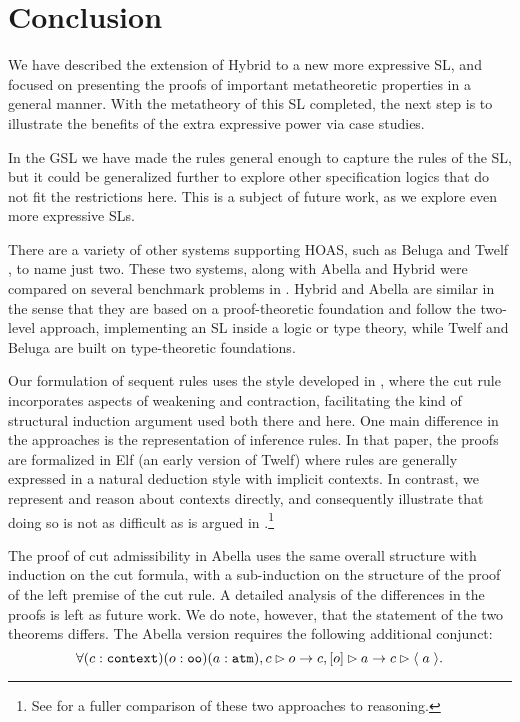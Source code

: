 \section{Conclusion}
\label{sec:concl}

We have described the extension of Hybrid to a new more expressive SL,
and focused on presenting the proofs of important metatheoretic
properties in a general manner.
With the metatheory of this SL completed, the next step is to
illustrate the benefits of the extra expressive power via case
studies.

In the GSL we have made the rules general enough to capture the rules
of the SL, but it could be generalized further to explore other
specification logics that do not fit the restrictions here.  This is a
subject of future work, as we explore even more expressive SLs.

There are a variety of other systems supporting HOAS, such as Beluga
\cite{Pientka:IJCAR10} and Twelf \cite{TwelfSP}, to name just two.
These two systems, along with Abella and Hybrid were compared on
several benchmark problems in \cite{FMP:JAR15}.  Hybrid and Abella are
similar in the sense that they are based on a proof-theoretic
foundation and follow the two-level approach, implementing an SL
inside a logic or type theory, while Twelf and Beluga are built on
type-theoretic foundations.

Our formulation of sequent rules uses the style developed in
\cite{Pfenning:IC00}, where the cut rule incorporates aspects of
weakening and contraction, facilitating the kind of structural
induction argument used both there and here.  One main difference in
the approaches is the representation of inference rules.  In that
paper, the proofs are formalized in Elf (an early version of Twelf)
where rules are generally expressed in a natural deduction style with
implicit contexts.  In contrast, we represent and reason about
contexts directly, and consequently illustrate that doing so is not as
difficult as is argued in \cite{Pfenning:IC00}.\footnote{See
  \cite{FMP:JAR15} for a fuller comparison of these two approaches to
  reasoning.}

The proof of cut admissibility in Abella uses the same overall
structure with induction on the cut formula, with a sub-induction on
the structure of the proof of the left premise of the cut rule.  A
detailed analysis of the differences in the proofs is left as future
work.  We do note, however, that the statement of the two theorems
differs.  The Abella version requires the following additional
conjunct:
$$\forall (c : \sltm{context}) (o : \sltm{oo}) (a: \hybridtm{atm}),\\
\seqsl[c]{o} \rightarrow \bchsl[c]{o}{a} \rightarrow \seqsl[c]{\atom{a}}.$$

